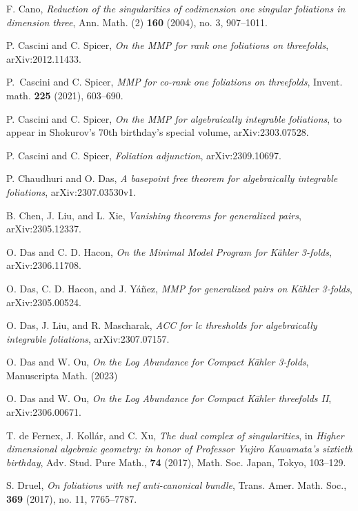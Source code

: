 \documentclass[11pt]{amsart}
\numberwithin{equation}{section}
\theoremstyle{definition}
\theoremstyle{definition}
\theoremstyle{definition}
\begin{document}
\begin{thebibliography}{99}
   F. Cano, \textit{Reduction of the singularities of codimension one singular foliations in dimension three}, Ann. Math. (2) \textbf{160} (2004), no. 3, 907--1011.

   P. Cascini and C. Spicer, \textit{On the MMP for rank one foliations on threefolds}, arXiv:2012.11433.

   P.~Cascini and C. Spicer, \textit{MMP for co-rank one foliations on threefolds}, Invent. math. \textbf{225} (2021), 603--690.

   P. Cascini and C. Spicer, \textit{On the MMP for algebraically integrable foliations}, to appear in Shokurov's 70th birthday's special volume, arXiv:2303.07528.

   P. Cascini and C. Spicer, \textit{Foliation adjunction}, arXiv:2309.10697.


   P. Chaudhuri and O. Das, \textit{A basepoint free theorem for algebraically integrable foliations}, arXiv:2307.03530v1.

   B. Chen, J. Liu, and L. Xie, \textit{Vanishing theorems for generalized pairs}, arXiv:2305.12337.

   O. Das and C. D. Hacon, \textit{On the Minimal Model Program for K\"ahler 3-folds}, arXiv:2306.11708.

   O. Das, C. D. Hacon, and J. Y\'a\~nez, \textit{MMP for generalized pairs on K\"ahler 3-folds}, arXiv:2305.00524.

   O. Das, J. Liu, and R. Mascharak, \textit{ACC for lc thresholds for algebraically integrable foliations}, arXiv:2307.07157.

   O. Das and W. Ou, \textit{On the Log Abundance for Compact K\"ahler 3-folds}, Manuscripta Math. (2023)

   O. Das and W. Ou, \textit{On the Log Abundance for Compact K\"ahler threefolds II}, arXiv:2306.00671.

   T. de Fernex, J. Koll\'ar, and C. Xu, \textit{The dual complex of singularities}, in \textit{Higher dimensional algebraic geometry: in honor of Professor Yujiro Kawamata’s sixtieth birthday}, Adv. Stud. Pure Math., \textbf{74} (2017), Math. Soc. Japan, Tokyo, 103--129.

   S. Druel, \textit{On foliations with nef anti-canonical bundle}, Trans. Amer. Math. Soc., \textbf{369} (2017), no. 11, 7765--7787.


\end{thebibliography}
\end{document}
